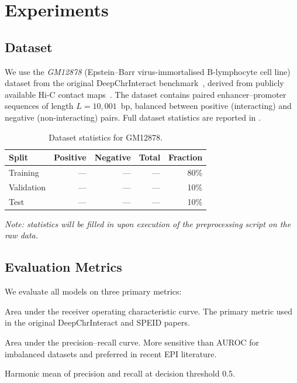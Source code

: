 \section{Experiments}
\label{sec:experiments}

\subsection{Dataset}

We use the \emph{GM12878} (Epstein--Barr virus-immortalised B-lymphocyte cell line)
dataset from the original DeepChrInteract benchmark~\cite{deepchrinteract_doc},
derived from publicly available Hi-C contact maps~\cite{hic}.
The dataset contains paired enhancer--promoter sequences of length $L = 10{,}001$~bp,
balanced between positive (interacting) and negative (non-interacting) pairs.
Full dataset statistics are reported in .

\begin{table}[H]
\centering
\caption{Dataset statistics for GM12878.}
\label{tab:dataset}
\begin{tabular}{lrrrr}
\toprule
Split & Positive & Negative & Total & Fraction \\
\midrule
Training   & --- & --- & --- & 80\% \\
Validation & --- & --- & --- & 10\% \\
Test       & --- & --- & --- & 10\% \\
\bottomrule
\end{tabular}
\end{table}

\textit{Note: statistics will be filled in upon execution of the preprocessing script on
the raw data.}

\subsection{Evaluation Metrics}

We evaluate all models on three primary metrics:

\begin{description}[noitemsep]
  \item[AUROC] Area under the receiver operating characteristic curve.
        The primary metric used in the original DeepChrInteract and SPEID papers.
  \item[AUPRC] Area under the precision--recall curve.
        More sensitive than AUROC for imbalanced datasets and preferred in
        recent EPI literature.
  \item[F1 Score] Harmonic mean of precision and recall at decision threshold 0.5.
\end{description}

